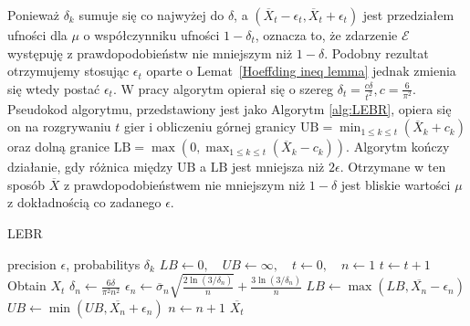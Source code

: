 \documentclass[inzynierska]{pwr_wmat_praca_dyplomowa}
\theoremstyle{plain}
\numberwithin{theorem}{chapter}
\theoremstyle{definition}
\numberwithin{theorem}{chapter}
\begin{document}
	Ponieważ $\delta_k$ sumuje się co najwyżej do $\delta$, a $(\overline{X}_t - \epsilon_t, \overline{X}_t + \epsilon_t)$ jest przedziałem ufności dla $\mu$ o współczynniku ufności $1-\delta_t$, oznacza to, że zdarzenie $\mathcal{E}$ występuję z prawdopodobieństw nie mniejszym niż $1-\delta$. Podobny rezultat otrzymujemy stosując $\epsilon_t$ oparte o Lemat~\ref{Hoeffding ineq lemma} jednak zmienia się wtedy postać $\epsilon_t$. W pracy \cite{cauwet2018surprising} algorytm opierał się o szereg $\delta_t=\frac{c\delta}{t^2}, c=\frac{6}{\pi^2}$.
	Pseudokod algorytmu, przedstawiony jest jako Algorytm \ref{alg:LEBR}, opiera się on na rozgrywaniu $t$ gier i obliczeniu górnej granicy $\text{UB} = \min_{1\le k\le t}( \overline{X}_k+c_k)$ oraz dolną granice $\text{LB} = \max(0, \max_{1\le k\le t}(\overline{X}_k-c_k))$. Algorytm kończy działanie, gdy różnica między $\text{UB}$ a $\text{LB}$ jest mniejsza niż $2\epsilon$. Otrzymane w ten sposób $\overline{X}$ z prawdopodobieństwem nie mniejszym niż $1 - \delta$ jest bliskie wartości $\mu$ z dokładnością co zadanego $\epsilon$.
	\begin{algorithm}
		\caption{LEBR}\label{alg:LEBR}
		\begin{algorithmic}
			\Ensure precision $\epsilon$, probabilitys $\delta_k$
			\State $LB \gets 0,\quad UB \gets \infty,\quad t \gets 0,\quad n \gets 1$ 
			\State $t \gets t + 1$
			\State Obtain $X_t$
			\State $\delta_n \gets \frac{6\delta}{\pi^2n^2}$					
			\State $\epsilon_n \gets \overline{\sigma}_n \sqrt{\frac{2\ln(3/\delta_n)}{n}} + \frac{3  \ln{(3 / \delta_n)}}{n}$ 
			\State $LB \gets \max(LB, \overline{X_n} - \epsilon_n)$
			\State $UB \gets \min(UB, \overline{X_n} + \epsilon_n)$
			\State $n \gets n + 1$
			\EndWhile
			\State \Return $ \overline{X_t}$		
		\end{algorithmic}
	\end{algorithm}
\end{document}
